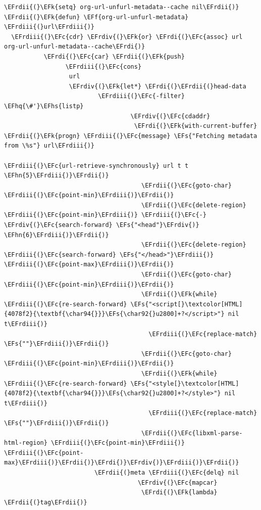 \documentclass{scrartcl}
\newcommand{\EFk}[1]{\textcolor{EFk}{#1}} %
\newcommand{\EFs}[1]{\textcolor{EFs}{#1}} %
\newcommand{\EFc}[1]{\textcolor{EFc}{#1}} %
\newcommand{\EFf}[1]{\textcolor{EFf}{#1}} %
\newcommand{\EFhn}[1]{\textcolor{EFhn}{\textbf{#1}}} %
\newcommand{\EFhq}[1]{\textcolor{EFhq}{#1}} %
\newcommand{\EFhs}[1]{\textcolor{EFhs}{#1}} %
\newcommand{\EFrdi}[1]{\textcolor{EFrdi}{#1}} %
\newcommand{\EFrdii}[1]{\textcolor{EFrdii}{#1}} %
\newcommand{\EFrdiii}[1]{\textcolor{EFrdiii}{#1}} %
\newcommand{\EFrdiv}[1]{\textcolor{EFrdiv}{#1}} %
\begin{document}
\begin{Code}
\begin{Verbatim}[]
\EFrdii{(}\EFk{setq} org-url-unfurl-metadata--cache nil\EFrdii{)}
\EFrdii{(}\EFk{defun} \EFf{org-url-unfurl-metadata} \EFrdiii{(}url\EFrdiii{)}
  \EFrdiii{(}\EFc{cdr} \EFrdiv{(}\EFk{or} \EFrdi{(}\EFc{assoc} url org-url-unfurl-metadata--cache\EFrdi{)}
           \EFrdi{(}\EFc{car} \EFrdii{(}\EFk{push}
                 \EFrdiii{(}\EFc{cons}
                  url
                  \EFrdiv{(}\EFk{let*} \EFrdi{(}\EFrdii{(}head-data
                          \EFrdiii{(}\EFc{-filter} \EFhq{\#'}\EFhs{listp}
                                   \EFrdiv{(}\EFc{cdaddr}
                                    \EFrdi{(}\EFk{with-current-buffer} \EFrdii{(}\EFk{progn} \EFrdiii{(}\EFc{message} \EFs{"Fetching metadata from \%s"} url\EFrdiii{)}
                                                                \EFrdiii{(}\EFc{url-retrieve-synchronously} url t t \EFhn{5}\EFrdiii{)}\EFrdii{)}
                                      \EFrdii{(}\EFc{goto-char} \EFrdiii{(}\EFc{point-min}\EFrdiii{)}\EFrdii{)}
                                      \EFrdii{(}\EFc{delete-region} \EFrdiii{(}\EFc{point-min}\EFrdiii{)} \EFrdiii{(}\EFc{-} \EFrdiv{(}\EFc{search-forward} \EFs{"<head"}\EFrdiv{)} \EFhn{6}\EFrdiii{)}\EFrdii{)}
                                      \EFrdii{(}\EFc{delete-region} \EFrdiii{(}\EFc{search-forward} \EFs{"</head>"}\EFrdiii{)} \EFrdiii{(}\EFc{point-max}\EFrdiii{)}\EFrdii{)}
                                      \EFrdii{(}\EFc{goto-char} \EFrdiii{(}\EFc{point-min}\EFrdiii{)}\EFrdii{)}
                                      \EFrdii{(}\EFk{while} \EFrdiii{(}\EFc{re-search-forward} \EFs{"<script[}\textcolor[HTML]{4078f2}{\textbf{\char94{}}}\EFs{\char92{}u2800]+?</script>"} nil t\EFrdiii{)}
                                        \EFrdiii{(}\EFc{replace-match} \EFs{""}\EFrdiii{)}\EFrdii{)}
                                      \EFrdii{(}\EFc{goto-char} \EFrdiii{(}\EFc{point-min}\EFrdiii{)}\EFrdii{)}
                                      \EFrdii{(}\EFk{while} \EFrdiii{(}\EFc{re-search-forward} \EFs{"<style[}\textcolor[HTML]{4078f2}{\textbf{\char94{}}}\EFs{\char92{}u2800]+?</style>"} nil t\EFrdiii{)}
                                        \EFrdiii{(}\EFc{replace-match} \EFs{""}\EFrdiii{)}\EFrdii{)}
                                      \EFrdii{(}\EFc{libxml-parse-html-region} \EFrdiii{(}\EFc{point-min}\EFrdiii{)} \EFrdiii{(}\EFc{point-max}\EFrdiii{)}\EFrdii{)}\EFrdi{)}\EFrdiv{)}\EFrdiii{)}\EFrdii{)}
                         \EFrdii{(}meta \EFrdiii{(}\EFc{delq} nil
                                     \EFrdiv{(}\EFc{mapcar}
                                      \EFrdi{(}\EFk{lambda} \EFrdii{(}tag\EFrdii{)}

\end{Verbatim}
\end{Code}
\end{document}

